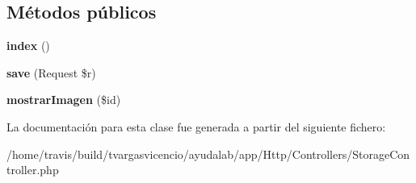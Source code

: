 \subsection*{\-Métodos públicos}
\begin{DoxyCompactItemize}
\item 
\hypertarget{class_app_1_1_http_1_1_controllers_1_1_storage_controller_a149eb92716c1084a935e04a8d95f7347}{{\bfseries index} ()}\label{class_app_1_1_http_1_1_controllers_1_1_storage_controller_a149eb92716c1084a935e04a8d95f7347}

\item 
\hypertarget{class_app_1_1_http_1_1_controllers_1_1_storage_controller_a5369f058d8c1c480e4d4775b8bc0a633}{{\bfseries save} (\-Request \$r)}\label{class_app_1_1_http_1_1_controllers_1_1_storage_controller_a5369f058d8c1c480e4d4775b8bc0a633}

\item 
\hypertarget{class_app_1_1_http_1_1_controllers_1_1_storage_controller_a4208fb06ad4d1df850e52354c7c455b7}{{\bfseries mostrar\-Imagen} (\$id)}\label{class_app_1_1_http_1_1_controllers_1_1_storage_controller_a4208fb06ad4d1df850e52354c7c455b7}

\end{DoxyCompactItemize}


\-La documentación para esta clase fue generada a partir del siguiente fichero\-:\begin{DoxyCompactItemize}
\item 
/home/travis/build/tvargasvicencio/ayudalab/app/\-Http/\-Controllers/\-Storage\-Controller.\-php\end{DoxyCompactItemize}
